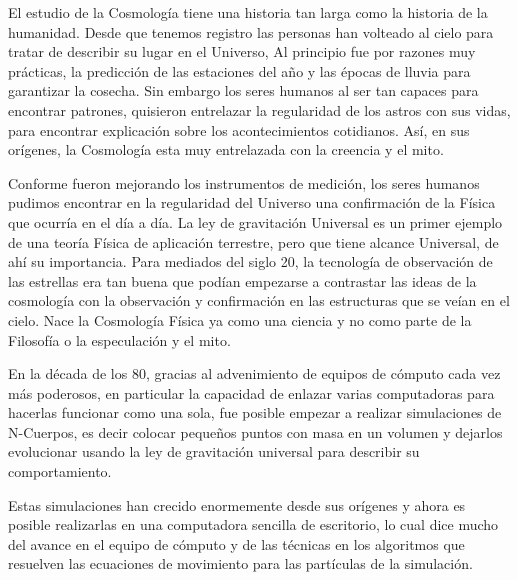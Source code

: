 \setcounter{equation}{0}

\newcommand{\altname}{Introducción}
\lhead[\fancyplain{}{}]%
      {\fancyplain{}{\bfseries \altname}}
\addchap{\altname}

El estudio de la Cosmología tiene una historia tan larga como la historia de la humanidad. Desde que tenemos registro las personas han volteado al cielo para tratar de describir su lugar en el Universo, Al principio fue por razones muy prácticas, la predicción de las estaciones del año y las épocas de lluvia para garantizar la cosecha. Sin embargo los seres humanos al ser tan capaces para encontrar patrones, quisieron entrelazar la regularidad de los astros con sus vidas, para encontrar explicación sobre los acontecimientos cotidianos. Así, en sus orígenes, la Cosmología esta muy entrelazada con la creencia y el mito.

Conforme fueron mejorando los instrumentos de medición, los seres humanos pudimos encontrar en la regularidad del Universo una confirmación de la Física que ocurría en el día a día. La ley de gravitación Universal es un primer ejemplo de una teoría Física de aplicación terrestre, pero que tiene alcance Universal, de ahí su importancia. Para mediados del siglo 20, la tecnología de observación de las estrellas era tan buena que podían empezarse a contrastar las ideas de la cosmología con la observación y confirmación en las estructuras que se veían en el cielo. Nace la Cosmología Física ya como una ciencia y no como parte de la Filosofía o la especulación y el mito.

En la década de los 80, gracias al advenimiento de equipos de cómputo cada vez más poderosos, en particular la capacidad de enlazar varias computadoras para hacerlas funcionar como una sola, fue posible empezar a realizar simulaciones de N-Cuerpos, es decir colocar pequeños puntos con masa en un volumen y dejarlos evolucionar usando la ley de gravitación universal para describir su comportamiento.

Estas simulaciones han crecido enormemente desde sus orígenes y ahora es posible realizarlas en una computadora sencilla de escritorio, lo cual dice mucho del avance en el equipo de cómputo y de las técnicas en los algoritmos que resuelven las ecuaciones de movimiento para las partículas de la simulación.

